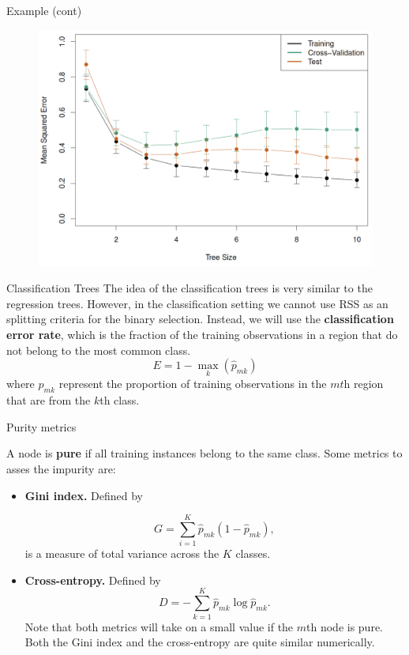 \documentclass{beamer}
\begin{document}
\begin{frame}{Example (cont)}
	\begin{figure}[h]
		\centering
		\includegraphics[scale=0.4]{../../Figures/fig_hitters_mse.png}
	\end{figure}
\end{frame}

\begin{frame}{Classification Trees}
	The idea of the classification trees is very similar to the regression trees. However, in the classification setting we cannot use RSS as an splitting criteria for the binary selection. Instead, we will use the {\bf classification  error rate}, which is the fraction of the training observations in a region that do not belong to the most common class.
	\begin{equation*}
		E= 1- \max_k (\hat{p}_{mk})
	\end{equation*} 
	where $\hat{p}_{mk}$ represent the proportion of training observations in the $mt$h region that are from the $k$th class.	
	

\end{frame}

\begin{frame}{Purity metrics}
	
	A node is {\bf pure} if all training instances belong to the same class. 
	Some metrics to asses the impurity are:
	\begin{itemize}
		\item {\bf Gini index.} Defined by
		
		\begin{equation*}
			G= \sum_{i=1}^K \hat{p}_{mk} (1 - \hat{p}_{mk}),
		\end{equation*}
		is a measure of total variance across the $K$ classes. 
	\item {\bf Cross-entropy. } Defined by
	\begin{equation*}
		D = - \sum_{k=1}^K \hat{p}_{mk}\log \hat{p}_{mk}.
	\end{equation*}	
	Note that both metrics will take on a small value if the $m$th node is pure. Both the Gini index and the cross-entropy are quite similar numerically. 
\end{itemize}
	
\end{frame}
\end{document}

